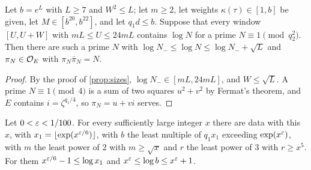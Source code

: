 \begin{lemma}\label{lem:level-prime}
Let $b=e^L$ with $L\ge7$ and $W^2\le L$; let $m\ge2$, let weights $\kappa(\tau)\in[1,b]$ be given, let
$M\in[b^{20},b^{22}]$, and let $q_1d\le b$. Suppose that every window $[U,U+W]$ with
$mL\le U\le24mL$ contains $\log N$ for a prime $N\equiv1\pmod{q_2^2}$. Then there are such a prime $N$
with $\log N_-\le\log N\le\log N_-+\sqrt L$ and $\pi_N\in\mathcal{O}_E$ with $\pi_N\bar\pi_N=N$.
\end{lemma}

\begin{proof}
By the proof of \cref{prop:sizes}, $\log N_-\in[mL,24mL]$, and $W\le\sqrt L$. A prime $N\equiv1
\pmod4$ is a sum of two squares $u^2+v^2$ by Fermat's theorem, and $E$ contains $i=\zeta^{q_1/4}$,
so $\pi_N=u+vi$ serves.
\end{proof}

\begin{theorem}\label{thm:data-exist}
Let $0<\varepsilon<1/100$. For every sufficiently large integer $x$ there are data with this $x$, with
$x_1=\lfloor\exp(x^{\varepsilon/6})\rfloor$, with $b$ the least multiple of $q_1x_1$ exceeding
$\exp(x^\varepsilon)$, with $m$ the least power of $2$ with $m\ge\sqrt x$ and $r$ the least power of $3$ with
$r\ge x^5$. For them $x^{\varepsilon/6}-1\le\log x_1$ and $x^\varepsilon\le\log b\le x^\varepsilon+1$.
\end{theorem}

